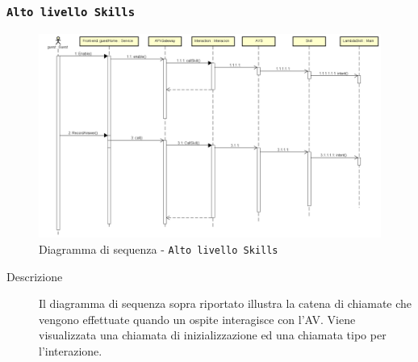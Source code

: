\documentclass[../DefinizioneDiProdotto.tex]{subfiles}
\begin{document}
		\newpage
		\subsubsection{\texttt{Alto livello Skills}}
		\begin{figure}[!h]
			\centering
			\includegraphics[width=\textwidth]{DiagrammiSequenza/Back-End/SequenzaSkills.png}
			\caption{Diagramma di sequenza - \texttt{Alto livello Skills }}
		\end{figure}
		\begin{description}
			\item [Descrizione] Il diagramma di sequenza sopra riportato illustra la catena di chiamate che vengono effettuate quando un ospite interagisce con l'AV. Viene visualizzata una chiamata di inizializzazione ed una chiamata tipo per l'interazione.
		\end{description}
\end{document}

